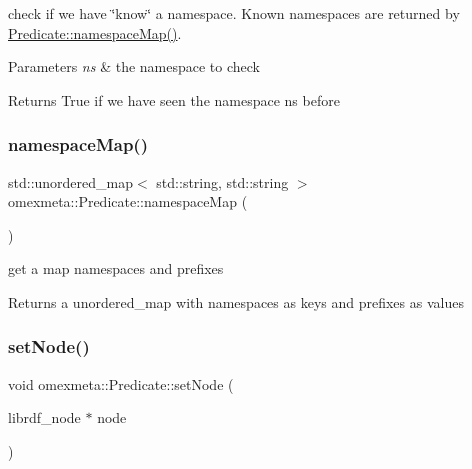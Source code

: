check if we have \char`\"{}know\char`\"{} a namespace. Known namespaces are returned by \hyperlink{classomexmeta_1_1Predicate_a1291e3cd9727871f568e864e0f5af3f0}{Predicate\+::namespace\+Map()}. 


\begin{DoxyParams}{Parameters}
{\em ns} & the namespace to check \\
\hline
\end{DoxyParams}
\begin{DoxyReturn}{Returns}
True if we have seen the namespace ns before 
\end{DoxyReturn}
\mbox{\label{classomexmeta_1_1Predicate_a1291e3cd9727871f568e864e0f5af3f0}} 
\subsubsection{\texorpdfstring{namespace\+Map()}{namespaceMap()}}
{\footnotesize\ttfamily std\+::unordered\+\_\+map$<$ std\+::string, std\+::string $>$ omexmeta\+::\+Predicate\+::namespace\+Map (\begin{DoxyParamCaption}{ }\end{DoxyParamCaption})\hspace{0.3cm}{\ttfamily [static]}}



get a map namespaces and prefixes 

\begin{DoxyReturn}{Returns}
a unordered\+\_\+map with namespaces as keys and prefixes as values 
\end{DoxyReturn}
\mbox{\label{classomexmeta_1_1Predicate_a0bf6030510247a6999d81cada92c1e51}} 
\subsubsection{\texorpdfstring{set\+Node()}{setNode()}}
{\footnotesize\ttfamily void omexmeta\+::\+Predicate\+::set\+Node (\begin{DoxyParamCaption}\item[{librdf\+\_\+node $\ast$}]{node }\end{DoxyParamCaption})}



